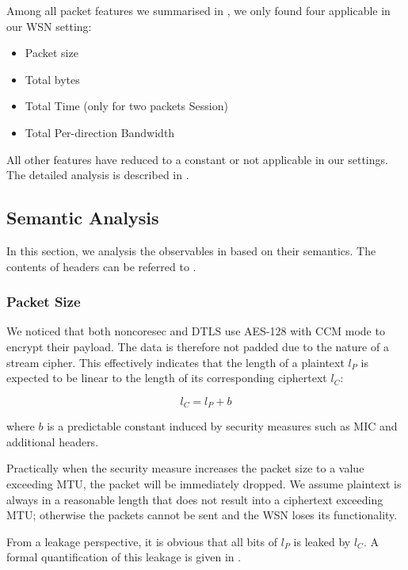 Among all packet features we summarised in , we only found four applicable in our WSN setting:
\begin{itemize}
	\item Packet size
	\item Total bytes
	\item Total Time (only for two packets Session)
	\item Total Per-direction Bandwidth
\end{itemize}

All other features have reduced to a constant or not applicable in our settings. The detailed analysis is described in .

\subsection{Semantic Analysis}

In this section, we analysis the observables in  based on their semantics. The contents of headers can be referred to .

\subsubsection{Packet Size}

We noticed that both noncoresec and DTLS use AES-128 with CCM mode to encrypt their payload. The data is therefore not padded due to the nature of a stream cipher. This effectively indicates that the length of a plaintext $l_P$ is expected to be linear to the length of its corresponding ciphertext $l_C$:

\begin{equation} \label{Eq: Linear Length}
	l_{C} = l_{P} + b
\end{equation}

where $b$ is a predictable constant induced by security measures such as MIC and additional headers.

Practically when the security measure increases the packet size to a value exceeding MTU, the packet will be immediately dropped. We assume plaintext is always in a reasonable length that does not result into a ciphertext exceeding MTU; otherwise the packets cannot be sent and the WSN loses its functionality.

From a leakage perspective, it is obvious that all bits of $l_P$ is leaked by $l_C$. A formal quantification of this leakage is given in .

